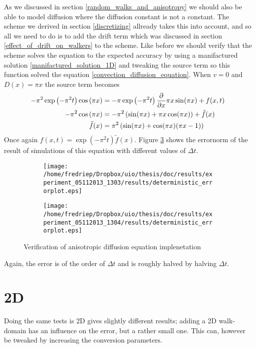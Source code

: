 As we discussed in section \ref{random_walks_and_anisotropy} we should also be able to model diffusion where the diffusion constant is not a constant. 
The scheme we derived in section \ref{discretizing} allready takes this into account, and so all we need to do is to add the drift term which was discussed in section \ref{effect_of_drift_on_walkers} to the scheme. 
Like before we should verify that the scheme solves the equation to the expected accuracy by using a manifactured solution \ref{manifactured_solution_1D} and tweaking the source term so this function solved the equation \ref{convection_diffusion_equation}. 
When $v=0$ and $D(x) = \pi x$ the source term becomes
\begin{align*}
 -\pi^2\exp\left(-\pi^2t\right)\cos\left(\pi x\right) &= -\pi\exp\left(-\pi^2t\right)\frac{\partial}{\partial x}\pi x\sin(\pi x) +f(x,t) \\
 -\pi^2\cos\left(\pi x\right) &= -\pi^2\left(\sin(\pi x) + \pi x\cos(\pi x)\right) +\tilde{f}(x) \\
 \tilde{f}(x) &= \pi^2\left(\sin(\pi x) +\cos(\pi x)(\pi x-1)\right)
\end{align*}
Once again $f(x,t) = \exp\left(-\pi^2t\right)\tilde{f}(x)$. Figure \ref{anisotropic_diffusion_verification} shows the errornorm of the result of simulations of this equation with different values of $\Delta t$.

\begin{figure}[H]
\centering
\begin{subfigure}[b]{0.48\textwidth}
\texttt{[image: /home/fredriep/Dropbox/uio/thesis/doc/results/experiment\_05112013\_1303/results/deterministic\_errorplot.eps]}
\caption{}
\label{anisotropic_diffusion_verification:single_dt}
\end{subfigure}
\begin{subfigure}[b]{0.48\textwidth}
\texttt{[image: /home/fredriep/Dropbox/uio/thesis/doc/results/experiment\_05112013\_1304/results/deterministic\_errorplot.eps]}
\caption{}
\label{anisotropic_diffusion_verification:double_dt}
\end{subfigure}
\caption[Verification of anisotropic diffusion equation implenetation]{Verification of anisotropic diffusion equation implenetation}
\label{anisotropic_diffusion_verification}
\end{figure}
Again, the error is of the order of $\Delta t$ and is roughly halved by halving $\Delta t$.
\section{2D}
Doing the same tests is 2D gives slightly different results; adding a 2D walk-domain has an influence on the error, but a rather small one. 
This can, however be tweaked by increasing the conversion parameters.

